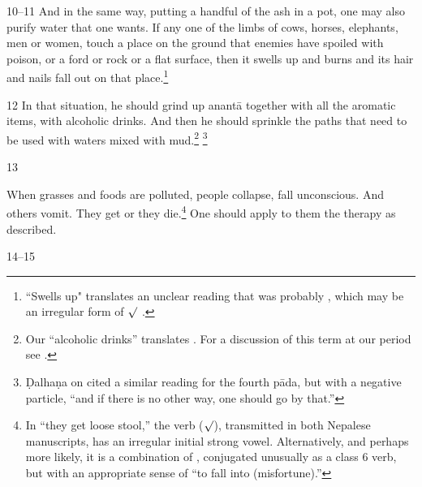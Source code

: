 \begin{translation}
\item
 [10--11]  And in the same way, putting a handful of  the ash in a pot, one may 
 also purify water  that  one wants.  If any one of the limbs of cows, horses,  
 elephants, men or women, touch a place on the ground that enemies have 
 spoiled with  poison, or a ford or rock or a flat surface, then it swells up and 
 burns and its  hair and nails fall out on that place.\footnote{``Swells up" 
 translates an  unclear reading that was probably , which may be 
 an irregular  form of $\surd$  
 \citep[see][175--176]{whit-root}.}  

\item
 [12]  In that situation, he should grind up  \gls{anantā} together with all the  
 aromatic items, with alcoholic drinks.  And then he should sprinkle the paths 
 that need to be used with waters mixed with  mud.\footnote{Our “alcoholic 
 drinks”  translates .  For a discussion of this  term at our period see 
 \cite[37--39 \emph{et passim}]{mchu-2021a}.}  \footnote{Ḍalhaṇa on   
 cited a similar  reading for the fourth pāda, but with a negative particle, “and if 
 there is no other way, one  should go by that.”}  

\item [13]  

When grasses and foods are  polluted, people collapse, fall
unconscious. And others vomit. They get   or
they  die.\footnote{In “they get loose stool,” the verb
     ($\surd$), transmitted in both Nepalese
    manuscripts, has an irregular initial strong vowel. Alternatively, and
    perhaps more likely, it is a combination of ,
    conjugated unusually as a class 6 verb, but with an appropriate sense
    of “to fall into (misfortune).”}  One should apply to them the therapy
    as described.

\item [14--15]  


\end{translation}
